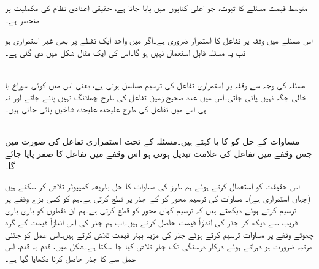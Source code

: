متوسط قیمت مسئلے کا ثبوت، جو اعلیٰ  کتابوں میں پایا جاتا ہے، حقیقی اعدادی نظام کی مکملیت پر منحصر ہے۔

اس مسئلے میں وقفہ  پر تفاعل  کا  استمرار ضروری ہے۔اگر  میں واحد  ایک نقطے پر بھی  غیر استمراری ہو تب یہ مسئلہ قابل استعمال نہیں ہو گا۔اس کی ایک مثال شکل  میں دی گئی ہے۔

\\
مسئلہ  کی وجہ سے وقفہ  پر استمراری تفاعل کی ترسیم مسلسل ہوتی ہے، یعنی اس میں کوئی سوراخ یا خالی جگہ نہیں پائی جاتی۔اس میں عدد صحیح زمین تفاعل  کی طرح چھلانگ  نہیں پائے جاتے   اور نہ ہی اس میں تفاعل  کی طرح علیحدہ علیحدہ شاخیں پائی جاتی ہیں۔

\\
مساوات  کے حل کو  کا  یا  کہتے ہیں۔مسئلہ  کے تحت استمراری تفاعل کی صورت میں جس وقفے میں تفاعل کی علامت  تبدیل ہوتی ہو اس وقفے میں تفاعل کا صفر پایا جائے گا۔

اس حقیقت کو استعمال کرتے ہوئے ہم   طرز کی مساوات کا حل بذریعہ کمپیوٹر تلاش کر سکتے ہیں  (جہاں  استمراری ہے)۔ مساوات کی ترسیم محور  کو  کے جذر پر قطع کرتی ہے۔ہم  کو کسی بڑے وقفے پر ترسیم کرتے ہوئے دیکھتے ہیں کہ ترسیم  کہاں محور  کو قطع کرتی ہے۔ہم ان نقطوں  کو باری باری قریب سے دیکھ کر جذر کی اندازاً قیمت حاصل کرتے ہیں۔اب ہم جذر کی اس اندازاً  قیمت کے گرد چھوٹے وقفے پر مساوات ترسیم کرتے ہوئے جذر کی مزید بہتر قیمت تلاش کرتے ہیں۔اس عمل کو جتنی مرتبہ ضرورت ہو دہراتے ہوئے درکار درستگی تک  جذر تلاش کیا جا سکتا ہے۔شکل  میں، قدم بہ قدم، اس عمل سے   کا  جذر حاصل کرنا دکھایا گیا ہے۔

